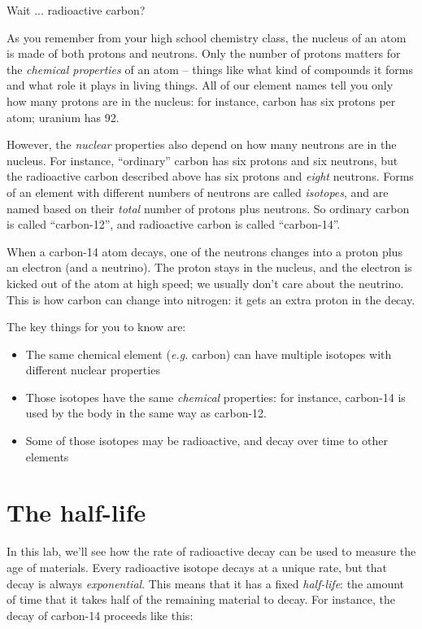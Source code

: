 \documentclass[11pt]{article}
\begin{document}
Wait ... radioactive carbon?

As you remember from your high school chemistry class, the nucleus of an atom is made of both protons and neutrons. Only the number of protons matters for the {\it chemical properties} of an atom -- things like what kind of compounds it forms and 
what role it plays in living things. All of our element names tell you only how many protons are in the nucleus: for instance, carbon has six protons per atom; uranium has 92. 

However, the {\it nuclear} properties also depend on how many neutrons are in the nucleus. For instance, ``ordinary'' carbon has six protons and six neutrons, but the radioactive carbon described above has six protons and {\it eight} neutrons. 
Forms of an element with different numbers of neutrons are called {\it isotopes}, and are named based on their {\it total} number of protons plus neutrons. So ordinary carbon is called ``carbon-12'', and radioactive carbon is called ``carbon-14''.

\newpage

When a carbon-14 atom decays, one of the neutrons changes into a proton plus an electron (and a neutrino). The proton stays in the nucleus, and the electron is kicked out of the atom at high speed; we usually don't care about the neutrino. This is how 
carbon can change into nitrogen: it gets an extra proton in the decay.

The key things for you to know are:

\begin{itemize}
\item The same chemical element ({\it e.g.} carbon) can have multiple isotopes with different nuclear properties
\item Those isotopes have the same {\it chemical} properties: for instance, carbon-14 is used by the body in the same way
as carbon-12.
\item Some of those isotopes may be radioactive, and decay over time to other elements
\end{itemize}

\section{The half-life}

In this lab, we'll see how the rate of radioactive decay can be used to measure the age of materials.
Every radioactive isotope decays at a unique rate, but that decay is always {\it exponential}. This means that it has a fixed
{\it half-life}: the amount of time that it takes half of the remaining material to decay. For instance, the decay of carbon-14
proceeds like this:
\end{document}
